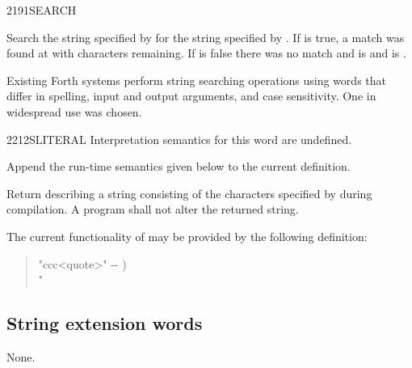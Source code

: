 \begin{worddef}{2191}{SEARCH}
\item {}

	Search the string specified by  for the
	string specified by . If  is
	true, a match was found at  with 
	characters remaining. If  is false there was no
	match and  is  and 
	is .

	\begin{rationale} %
		Existing Forth systems perform string searching operations
		using words that differ in spelling, input and output
		arguments, and case sensitivity. One in widespread use was
		chosen.
	\end{rationale}
\end{worddef}


\begin{worddef}{2212}{SLITERAL}
\interpret
	Interpretation semantics for this word are undefined.

\compile

	Append the run-time semantics given below to the current
	definition.

\runtime

	Return  describing a string consisting of
	the characters specified by  during
	compilation. A program shall not alter the returned string.

	\begin{rationale} %
		The current functionality of  may be
		provided by the following definition:
		\begin{quote}\ttfamily
			\word{:}   "ccc<quote>" -{}- ) \\
			\tab \word{[CHAR]} "  ~
				  \\
			\word{;} 
		\end{quote}
	\end{rationale}
\end{worddef}


\subsection{String extension words} %

None.
